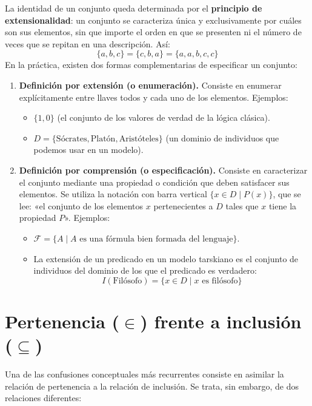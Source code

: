 La identidad de un conjunto queda determinada por el \textbf{principio
  de extensionalidad}: un conjunto se caracteriza única y
exclusivamente por cuáles son sus elementos, sin que importe el orden
en que se presenten ni el número de veces que se repitan en una
descripción. Así:
\[
\{a, b, c\} = \{c, b, a\} = \{a, a, b, c, c\}
\]
En la práctica, existen dos formas complementarias de especificar un conjunto:
\begin{enumerate}
    \item \textbf{Definición por extensión (o enumeración).} Consiste
      en enumerar explícitamente entre llaves todos y cada uno de los
      elementos. Ejemplos: 
    \begin{itemize}
        \item $\{1, 0\}$ (el conjunto de los
          valores de verdad de la lógica clásica).
        \item $D = \{\text{Sócrates},
          \text{Platón}, \text{Aristóteles}\}$ (un dominio de
          individuos que podemos usar en un modelo). 
    \end{itemize}

    \item \textbf{Definición por comprensión (o especificación).}
      Consiste en caracterizar el conjunto mediante una propiedad o
      condición que deben satisfacer sus elementos. Se utiliza la
      notación con barra vertical $\{x \in D \mid P(x)\}$, que se lee:
      «el conjunto de los elementos $x$ pertenecientes a $D$ tales que
      $x$ tiene la propiedad $P$». Ejemplos: 
    \begin{itemize}
        \item $\mathcal{F} = \{A \mid A \text{ es una fórmula bien formada del lenguaje}\}$.
        \item La extensión de un predicado en un modelo tarskiano es el conjunto de individuos del dominio de los que el predicado es verdadero:
        \[
        I(\text{Filósofo}) = \{x \in D \mid x \text{ es filósofo}\}
        \]
    \end{itemize}
\end{enumerate}

\section{Pertenencia (\texorpdfstring{$\in$}{pertenece}) frente a inclusión (\texorpdfstring{$\subseteq$}{incluido})}

Una de las confusiones conceptuales más recurrentes consiste en asimilar la relación de pertenencia a la relación de inclusión. Se trata, sin embargo, de dos relaciones diferentes:

